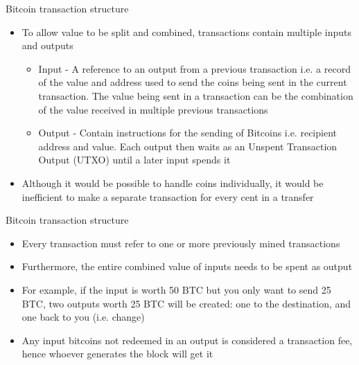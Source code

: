 \documentclass[10pt]{beamer}
\begin{document}


\begin{frame}{Bitcoin transaction structure}
	\begin{itemize}
		\item To allow value to be split and combined, transactions contain multiple inputs and outputs
		\begin{itemize}
			\item Input - A reference to an output from a previous transaction i.e. a record of the value and address used to send the coins being sent in the current transaction. The value being sent in a transaction can be the combination of the value received in multiple previous transactions
			\item Output - Contain instructions for the sending of Bitcoins i.e. recipient address and value. Each output then waits as an Unspent Transaction Output (UTXO) until a later input spends it
		\end{itemize}
		\item Although it would be possible to handle coins individually, it would be inefficient to make a separate transaction for every cent in a transfer
	\end{itemize}
\end{frame}


\begin{frame}{Bitcoin transaction structure}
	\begin{itemize}
		\item Every transaction must refer to one or more previously mined transactions
		\item Furthermore, the entire combined value of inputs needs to be spent as output
		\item For example, if the input is worth 50 BTC but you only want to send 25 BTC, two outputs worth 25 BTC will be created: one to the destination, and one back to you (i.e. change)
		\item Any input bitcoins not redeemed in an output is considered a transaction fee, hence whoever generates the block will get it
	\end{itemize}
\end{frame}

\end{document}
